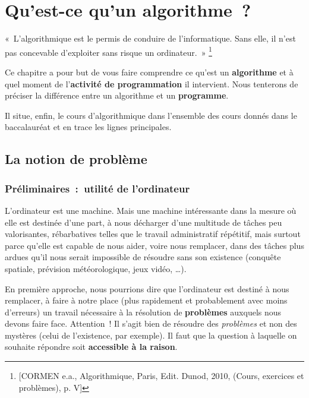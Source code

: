 \chapter{Qu’est-ce qu’un algorithme~?}

	\begin{Exergue}
		«~L’algorithmique est le permis de conduire de l’informatique.
		Sans elle, il n’est pas concevable d’exploiter sans risque un ordinateur.~»
		\footnote{[CORMEN e.a., Algorithmique, Paris, Edit. Dunod, 2010, (Cours, 
		exercices et problèmes), p. V] }
	\end{Exergue}

	Ce chapitre a pour but de vous faire comprendre ce
	qu’est un \textbf{algorithme} et à quel moment de
	l’\textbf{activité de programmation} il intervient. 
	Nous tenterons de préciser la différence entre un algorithme 
	et un \textbf{programme}.
	
	Il situe, enfin, le cours d'algorithmique
	dans l’ensemble des cours donnés dans le baccalauréat et
	en trace les lignes principales.

\section{La notion de problème}

	\subsection{Préliminaires~:~utilité de l’ordinateur}
	
		L’ordinateur est une machine. Mais une machine intéressante dans la
		mesure où elle est destinée d’une part, à nous décharger d’une
		multitude de tâches peu valorisantes, rébarbatives telles que le
		travail administratif répétitif, mais surtout parce qu’elle est capable
		de nous aider, voire nous remplacer, dans des tâches plus ardues qu’il
		nous serait impossible de résoudre sans son existence (conquête
		spatiale, prévision météorologique, jeux vidéo, \dots).
		
		En première approche, nous pourrions dire que l’ordinateur est destiné à
		nous remplacer, à faire à notre place (plus rapidement et probablement
		avec moins d’erreurs) un travail nécessaire à la résolution de
		\textbf{problèmes} auxquels nous devons faire face. Attention~! Il
		s’agit bien de résoudre des \textit{problèmes} et non des mystères
		(celui de l’existence, par exemple). Il faut que la question à laquelle
		on souhaite répondre soit \textbf{accessible à la raison}.

